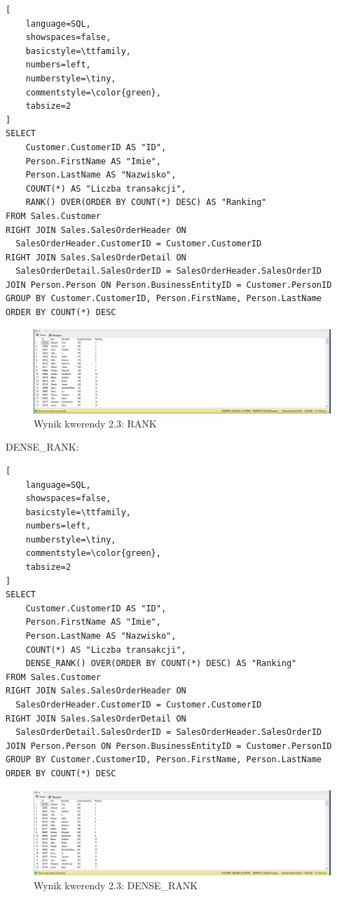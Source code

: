 \documentclass[a4paper,12pt]{article}
\begin{document}
{\small
\begin{lstlisting}[
	language=SQL,
	showspaces=false,
	basicstyle=\ttfamily,
	numbers=left,
	numberstyle=\tiny,
	commentstyle=\color{green},
	tabsize=2
]
SELECT 
	Customer.CustomerID AS "ID",
	Person.FirstName AS "Imie",
	Person.LastName AS "Nazwisko",
	COUNT(*) AS "Liczba transakcji",
	RANK() OVER(ORDER BY COUNT(*) DESC) AS "Ranking"
FROM Sales.Customer
RIGHT JOIN Sales.SalesOrderHeader ON 
  SalesOrderHeader.CustomerID = Customer.CustomerID
RIGHT JOIN Sales.SalesOrderDetail ON 
  SalesOrderDetail.SalesOrderID = SalesOrderHeader.SalesOrderID
JOIN Person.Person ON Person.BusinessEntityID = Customer.PersonID
GROUP BY Customer.CustomerID, Person.FirstName, Person.LastName
ORDER BY COUNT(*) DESC
\end{lstlisting}}

\begin{figure}[H]
  \centering
  \includegraphics[width=1.0\textwidth]{images/2.3.png}
  \caption{Wynik kwerendy 2.3: RANK}
\end{figure}

DENSE\_RANK:

{\small
\begin{lstlisting}[
	language=SQL,
	showspaces=false,
	basicstyle=\ttfamily,
	numbers=left,
	numberstyle=\tiny,
	commentstyle=\color{green},
	tabsize=2
]
SELECT 
	Customer.CustomerID AS "ID",
	Person.FirstName AS "Imie",
	Person.LastName AS "Nazwisko",
	COUNT(*) AS "Liczba transakcji",
	DENSE_RANK() OVER(ORDER BY COUNT(*) DESC) AS "Ranking"
FROM Sales.Customer
RIGHT JOIN Sales.SalesOrderHeader ON 
  SalesOrderHeader.CustomerID = Customer.CustomerID
RIGHT JOIN Sales.SalesOrderDetail ON 
  SalesOrderDetail.SalesOrderID = SalesOrderHeader.SalesOrderID
JOIN Person.Person ON Person.BusinessEntityID = Customer.PersonID
GROUP BY Customer.CustomerID, Person.FirstName, Person.LastName
ORDER BY COUNT(*) DESC
\end{lstlisting}}

\begin{figure}[H]
  \centering
  \includegraphics[width=1.0\textwidth]{images/2.3_dense.png}
  \caption{Wynik kwerendy 2.3: DENSE\_RANK}
\end{figure}
\end{document}
